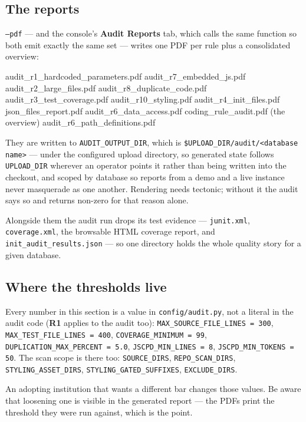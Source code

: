 \documentclass[11pt]{article}
\newcommand{\cfg}[1]{\texttt{#1}}
\newcommand{\rulename}[1]{\textbf{#1}}
\begin{document}
\subsection{The reports}

\texttt{--pdf} --- and the console's \textbf{Audit Reports} tab, which calls the same
function so both emit exactly the same set --- writes one PDF per rule plus a consolidated
overview:

\begin{code}
audit_r1_hardcoded_parameters.pdf     audit_r7_embedded_js.pdf
audit_r2_large_files.pdf              audit_r8_duplicate_code.pdf
audit_r3_test_coverage.pdf            audit_r10_styling.pdf
audit_r4_init_files.pdf               json_files_report.pdf
audit_r6_data_access.pdf              coding_rule_audit.pdf   (the overview)
audit_r6_path_definitions.pdf
\end{code}

They are written to \texttt{AUDIT\_OUTPUT\_DIR}, which is
\texttt{\$UPLOAD\_DIR/audit/<database name>} --- under the configured upload directory, so
generated state follows \cfg{UPLOAD\_DIR} wherever an operator points it rather than being
written into the checkout, and scoped by database so reports from a demo and a live
instance never masquerade as one another. Rendering needs tectonic; without it the audit
says so and returns non-zero for that reason alone.

Alongside them the audit run drops its test evidence --- \texttt{junit.xml},
\texttt{coverage.xml}, the browsable HTML coverage report, and
\texttt{init\_audit\_results.json} --- so one directory holds the whole quality story for a
given database.

\subsection{Where the thresholds live}

Every number in this section is a value in \texttt{config/audit.py}, not a literal in the
audit code (\rulename{R1} applies to the audit too):
\texttt{MAX\_SOURCE\_FILE\_LINES = 300}, \texttt{MAX\_TEST\_FILE\_LINES = 400},
\texttt{COVERAGE\_MINIMUM = 99}, \texttt{DUPLICATION\_MAX\_PERCENT = 5.0},
\texttt{JSCPD\_MIN\_LINES = 8}, \texttt{JSCPD\_MIN\_TOKENS = 50}. The scan scope is there
too: \texttt{SOURCE\_DIRS}, \texttt{REPO\_SCAN\_DIRS}, \texttt{STYLING\_ASSET\_DIRS},
\texttt{STYLING\_GATED\_SUFFIXES}, \texttt{EXCLUDE\_DIRS}.

An adopting institution that wants a different bar changes those values. Be aware that
loosening one is visible in the generated report --- the PDFs print the threshold they were
run against, which is the point.
\end{document}
